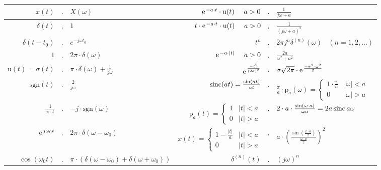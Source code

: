 \begin{landscape}
\begin{center}
\renewcommand{\arraystretch}{2.5}
\begin{tabular}{|rll|rll|}
\hline
    $x(t)$ & $\FT$ & $X(\omega)$ &
    $\e^{-a \cdot t} \cdot \text{u}(t) ~~~~ a > 0$ & $\FT$ & $\frac{1}{j\omega + a}$
  \\ \hline
    $\delta(t)$ & $\FT$ & $1$ &
    $t \cdot \e^{-a \cdot t} \cdot \text{u}(t) ~~~~ a > 0$ & $\FT$ & $\frac{1}{(j\omega + a)^2}$
  \\ \hline
    $\delta(t-t_0)$ & $\FT$ & $e^{-j\omega t_0}$
    & $t^n$ &$\FT$& $2 \pi j^n \delta^{(n)}(\omega) ~~~~ (n=1,2,...)$ 
  \\ \hline
    $1$ & $\FT$ & $2 \pi \cdot \delta(\omega)$ &
    $\e^{-a \cdot |t|} ~~~~ a > 0$ & $\FT$ & $\frac{2a}{\omega^2 + a^2}$
  \\ \hline
    $\text{u}(t)=\sigma(t)$ & $\FT$ & $\pi \cdot \delta(\omega) + \frac{1}{j\omega}$ &
    $\e^{\frac{-t^2}{(2\sigma)^2}}$ & $\FT$ & $\sigma \sqrt{2\pi} \cdot
    \e^{\frac{-\sigma^2 \cdot \omega^2}{2}}$
  \\ \hline
    $\text{sgn}(t)$ & $\FT$ & $\frac{2}{j\omega}$ &
    $\operatorname{sinc}(a t)=\frac{\sin(a t)}{a t}$ & $\FT$ & $\frac{\pi}{a} \cdot \text{p}_a(\omega)=\begin{cases} 1 \cdot \frac{\pi}{a} &
    |\omega| < a \\ 0 & |\omega| > a \end{cases} $
  \\ \hline
    $\frac{1}{\pi \cdot t}$ & $\FT$ & $-j \cdot \text{sgn}(\omega)$ &
    $\text{p}_a(t)=\begin{cases} 1 & |t| < a \\ 0 & |t| > a \end{cases} $ & $\FT$ & $2
    \cdot a \cdot \frac{\sin(\omega \cdot a)}{\omega a} = 2a \operatorname{sinc}{a \omega}$
  \\ \hline
    $\e^{j \omega_0 t}$ & $\FT$ & $2 \pi \cdot \delta(\omega - \omega_0)$ 
     & $x(t) = \begin{cases} 1 - \frac{|t|}{a} & |t| < a \\ 0 & |t| > a \end{cases}$
     & $\FT$ & $a \cdot \left ( \frac{\sin(\frac{\omega \cdot a}{2})}{\frac{\omega \cdot a}{2}} \right )^2$
  \\ \hline
    $\cos(\omega_0 t)$ & $\FT$ & $\pi \cdot \left ( \delta(\omega - \omega_0) + \delta(\omega + \omega_0) \right )$ 
    &$\delta^{(n)}(t)$ &$\FT$ & $(j\omega)^n$
  \\ \hline

\end{tabular}
\end{center}
\end{landscape}

